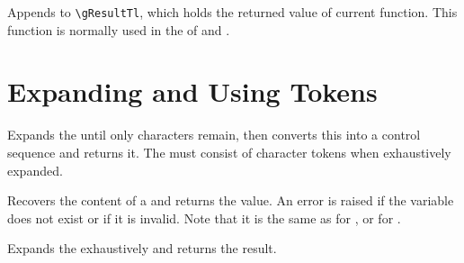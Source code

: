 \documentclass[oneside]{book}
\begin{document}
\begin{function}{\Result}
\begin{syntax}
 
\end{syntax}
Appends  to \verb!\gResultTl!, which holds the returned value of current function.
This function is normally used in the  of  and .
\end{function}

\section{Expanding and Using Tokens}

\begin{function}{\Name}
\begin{syntax}
 
\end{syntax}
Expands the  until only characters
remain, then converts this into a control sequence and returns it.
The  must consist of character tokens %
when exhaustively expanded.%
\end{function}

\begin{function}{\Value}
\begin{syntax}
 
\end{syntax}
Recovers the content of a  and returns the value.
An error is raised if the variable does not exist or if it is invalid.
Note that it is the same as  for , or  for .
\end{function}

\begin{function}{\Expand}
\begin{syntax}
 
\end{syntax}
Expands the  exhaustively and returns the result.
\end{function}
\end{document}
